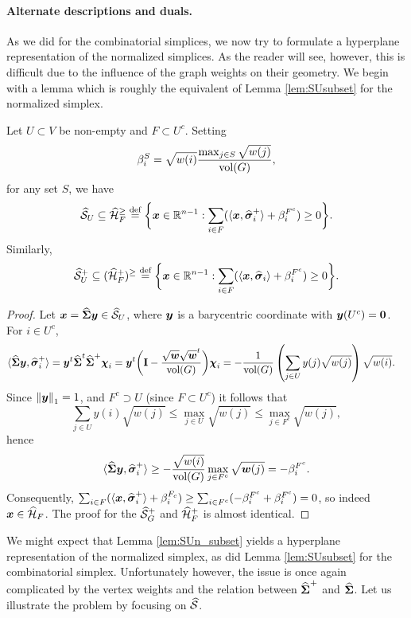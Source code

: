 \paragraph{Alternate descriptions and duals.} As we did for the combinatorial simplices, we now try to formulate a hyperplane representation of the normalized simplices. As the reader will see, however, this is difficult due to the influence of the graph weights on their geometry. We begin with a lemma which is roughly the equivalent of Lemma \ref{lem:SUsubset} for the normalized simplex. 

\begin{lemma}
	\label{lem:SUn_subset}
	Let $U\subset V$ be non-empty and $F\subset U^c$. Setting 
	\[\beta_i^S = \sqrt{w(i)} \frac{\max_{j\in S} \sqrt{w(j)}}{\textnormal{vol}(G)},\]
	for any set $S$, we have 
	\begin{equation*}
	\widehat{\mathcal{S}}_U \subseteq \widehat{\mathcal{H}}_{F}^\geq \overset{\text{def}}{=} \bigg\{\vb*{x}\in\mathbb{R}^{n-1}: \sum_{i\in F} (\langle \vb*{x},\widehat{\vb*{\sigma}}_i^+\rangle + \beta_i^{F^c})\ge 0\bigg\}.
	\end{equation*}
	Similarly, 
	\begin{equation*}
	\widehat{\mathcal{S}}^+_U \subseteq (\widehat{\mathcal{H}}^+_{F})^\geq \overset{\text{def}}{=} \bigg\{\vb*{x}\in\mathbb{R}^{n-1}: \sum_{i\in F} (\langle \vb*{x},\widehat{\vb*{\sigma}}_i\rangle + \beta_i^{F^c})\ge 0\bigg\}.
	\end{equation*}
\end{lemma} 
\begin{proof}
	Let $\vb*{x}=\widehat{\boldsymbol{\Sigma}}\vb*{y}\in \widehat{\mathcal{S}}_U$, where $\vb*{y}$  is a barycentric coordinate with $\vb*{y}(U^c)=\vb{0}$. For $i\in U^c$, 
	\begin{align*}
	\langle \widehat{\boldsymbol{\Sigma}}\vb*{y},\widehat{\vb*{\sigma}}_i^+ \rangle &= \vb*{y}^t \widehat{\boldsymbol{\Sigma}}^t \widehat{\boldsymbol{\Sigma}}^+ \boldsymbol{\chi}_i = \vb*{y}^t \bigg(\vb{I}-\frac{\sqrt{\vb*{w}}\sqrt{\vb*{w}}^t}{\textnormal{vol}(G)}\bigg)\boldsymbol{\chi}_i = - \frac{1}{\textnormal{vol}(G)} \left(\sum_{j\in U}y(j) \sqrt{w(j)}\right) \sqrt{w(i)}.
	\end{align*}
	Since $\norm{\vb*{y}}_1=1$, and $F^c\supset U$ (since $F\subset U^c$) it follows that 
	\[\sum_{j\in U}y(i) \sqrt{w(j)} \leq \max_{j\in U} \sqrt{w(j)} \leq \max_{j\in F^c}\sqrt{w(j)},\]
	hence 
	\[\langle \widehat{\boldsymbol{\Sigma}}\vb*{y},\widehat{\vb*{\sigma}}_i^+\rangle \geq -\frac{\sqrt{w(i)}}{\textnormal{vol}(G)} \max_{j\in F^c}\sqrt{\vb*{w}(j)} = -\beta_i^{F^c}.\]  
	Consequently, $\sum_{i\in F} (\langle \vb*{x},\widehat{\vb*{\sigma}}_i^+\rangle + \beta_i^{F_c}) \geq \sum_{i\in F^c}(-\beta_i^{F^c} +\beta_i^{F^c})=0$, so indeed $\vb*{x}\in \widehat{\mathcal{H}}_F$. The proof for the $\widehat{\mathcal{S}}^+_G$ and $\widehat{\mathcal{H}}_F^+$ is almost identical. 
\end{proof}

We might expect that Lemma \ref{lem:SUn_subset} yields a hyperplane representation of the normalized simplex, as did Lemma \ref{lem:SUsubset} for the combinatorial simplex. Unfortunately however, the issue is once again complicated by the vertex weights and the relation between $\widehat{\boldsymbol{\Sigma}}^+$ and $\widehat{\boldsymbol{\Sigma}}$. Let us illustrate the problem by focusing on $\widehat{\mathcal{S}}$. 

